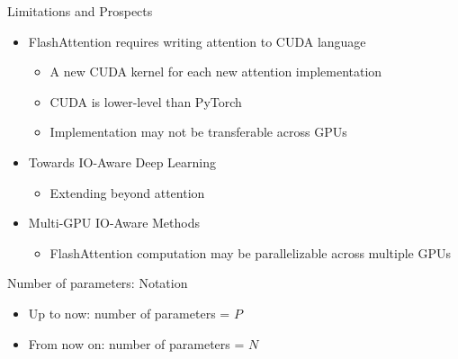 
\begin{vbframe}{Limitations and Prospects}

\vfill

\begin{itemize}
	\item FlashAttention requires writing attention to CUDA language
	\begin{itemize}
		\item A new CUDA kernel for each new attention implementation
		\item CUDA is lower-level than PyTorch
		\item Implementation may not be transferable across GPUs
	\end{itemize}
	\item Towards IO-Aware Deep Learning
	\begin{itemize}
		\item Extending beyond attention
	\end{itemize}
	\item Multi-GPU IO-Aware Methods
	\begin{itemize}
		\item FlashAttention computation may be parallelizable across multiple GPUs
	\end{itemize}
\end{itemize}

\vfill

\end{vbframe}


\begin{vbframe}{Number of parameters: Notation}

\vfill

\begin{itemize}

	\item Up to now: number of parameters = $P$
	\item From now on: number of parameters = $N$


\end{itemize}

\vfill

\end{vbframe}



